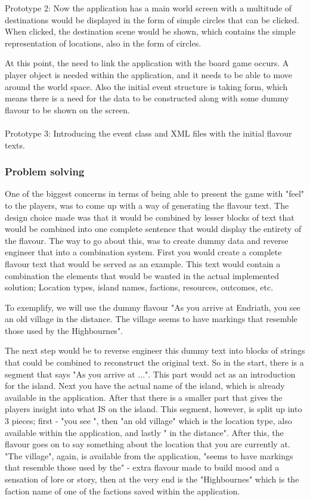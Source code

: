 Prototype 2:
Now the application has a main world screen with a multitude of destinations would be displayed in the form of simple circles that can be clicked. When clicked, the destination scene would be shown, which contains the simple representation of locations, also in the form of circles.

At this point, the need to link the application with the board game occurs. A player object is needed within the application, and it needs to be able to move around the world space. Also the initial event structure is taking form, which means there is a need for the data to be constructed along with some dummy flavour to be shown on the screen.\\\\

Prototype 3:
Introducing the event class and XML files with the initial flavour texts. 

\subsubsection{Problem solving}
One of the biggest concerns in terms of being able to present the game with "feel" to the players, was to come up with a way of generating the flavour text. The design choice made was that it would be combined by lesser blocks of text that would be combined into one complete sentence that would display the entirety of the flavour. The way to go about this, was to create dummy data and reverse engineer that into a combination system. First you would create a complete flavour text that would be served as an example. This text would contain a combination the elements that would be wanted in the actual implemented solution; Location types, island names, factions, resources, outcomes, etc.

To exemplify, we will use the dummy flavour "As you arrive at Endriath, you see an old village in the distance. The village seems to have markings that resemble those used by the Highbournes".

The next step would be to reverse engineer this dummy text into blocks of strings that could be combined to reconstruct the original text. So in the start, there is a segment that says "As you arrive at ...". This part would act as an introduction for the island. Next you have the actual name of the island, which is already available in the application. After that there is a smaller part that gives the players insight into what IS on the island. This segment, however, is split up into 3 pieces; first - "you see ", then "an old village" which is the location type, also available within the application, and lastly " in the distance". After this, the flavour goes on to say something about the location that you are currently at. "The village", again, is available from the application, "seems to have markings that resemble those used by the" - extra flavour made to build mood and a sensation of lore or story, then at the very end is the "Highbournes" which is the faction name of one of the factions saved within the application.

